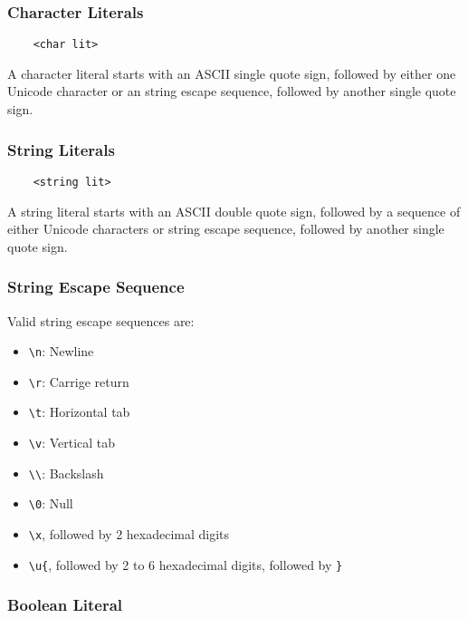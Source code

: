 \documentclass[a4paper]{article}
\begin{document}
\subsubsection{Character Literals}

\begin{verbatim}
    <char lit>
\end{verbatim}

A character literal starts with an ASCII single quote sign, followed by either one Unicode character or an string escape sequence, followed by another single quote sign.

\subsubsection{String Literals}

\begin{verbatim}
    <string lit>
\end{verbatim}

A string literal starts with an ASCII double quote sign, followed by a sequence of either Unicode characters or string escape sequence, followed by another single quote sign.

\subsubsection{String Escape Sequence}

Valid string escape sequences are:

\begin{itemize}
    \item \verb|\n|: Newline
    \item \verb|\r|: Carrige return
    \item \verb|\t|: Horizontal tab
    \item \verb|\v|: Vertical tab
    \item \verb|\\|: Backslash
    \item \verb|\0|: Null
    \item \verb|\x|, followed by 2 hexadecimal digits
    \item \verb|\u{|, followed by 2 to 6 hexadecimal digits, followed by \verb|}|
\end{itemize}

\subsubsection{Boolean Literal}
\end{document}
